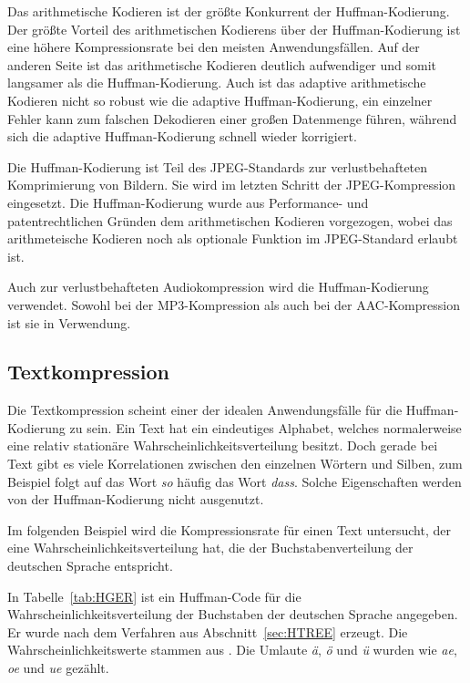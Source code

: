 \documentclass[twoside,11pt,a4paper]{article}
\theoremstyle{break}
\begin{document}
Das arithmetische Kodieren ist der größte Konkurrent der
Huffman-Kodierung. Der größte Vorteil des arithmetischen Kodierens
über der Huffman-Kodierung ist eine höhere Kompressionsrate bei den
meisten Anwendungsfällen. Auf der anderen Seite ist das arithmetische
Kodieren deutlich aufwendiger und somit langsamer als die
Huffman-Kodierung. Auch ist das adaptive arithmetische Kodieren nicht
so robust wie die adaptive Huffman-Kodierung, ein einzelner Fehler
kann zum falschen Dekodieren einer großen Datenmenge führen, während
sich die adaptive Huffman-Kodierung schnell wieder
korrigiert. \cite{Bookstein:1993}

Die Huffman-Kodierung ist Teil des JPEG-Standards zur verlustbehafteten
Komprimierung von Bildern. Sie wird im letzten Schritt der
JPEG-Kompression eingesetzt. Die Huffman-Kodierung wurde aus
Performance- und patentrechtlichen Gründen dem arithmetischen Kodieren
vorgezogen, wobei das arithmeteische Kodieren noch als optionale
Funktion im JPEG-Standard erlaubt ist. \cite{Wallace:1991}

Auch zur verlustbehafteten Audiokompression wird die Huffman-Kodierung
verwendet. Sowohl bei der MP3-Kompression als auch bei der
AAC-Kompression ist sie in Verwendung. \cite[S. 1055 -- S. 1076]{Salomon:2010}

\subsection{Textkompression}
Die Textkompression scheint einer der idealen Anwendungsfälle für die
Huffman-Kodier\-ung zu sein. Ein Text hat ein eindeutiges Alphabet,
welches normalerweise eine relativ stationäre
Wahrscheinlichkeitsverteilung besitzt. Doch gerade bei Text gibt es
viele Korrelationen zwischen den einzelnen Wörtern und Silben, zum
Beispiel folgt auf das Wort \emph{so} häufig das Wort
\emph{dass}. Solche Eigenschaften werden von der Huffman-Kodierung
nicht ausgenutzt. \cite[S. 74]{Sayood:2006}

Im folgenden Beispiel wird die Kompressionsrate für einen Text
untersucht, der eine Wahrscheinlichkeitsverteilung hat, die der
Buchstabenverteilung der deutschen Sprache entspricht.

In Tabelle~\ref{tab:HGER} ist ein Huffman-Code für die
Wahrscheinlichkeitsverteilung der Buchstaben der deutschen Sprache
angegeben. Er wurde nach dem Verfahren aus Abschnitt~\ref{sec:HTREE}
erzeugt. Die Wahrscheinlichkeitswerte stammen aus
\cite[S. 10]{Beutelspacher:2005}. Die Umlaute \emph{ä}, \emph{ö} und
\emph{ü} wurden wie \emph{ae}, \emph{oe} und \emph{ue} gezählt.
\end{document}
